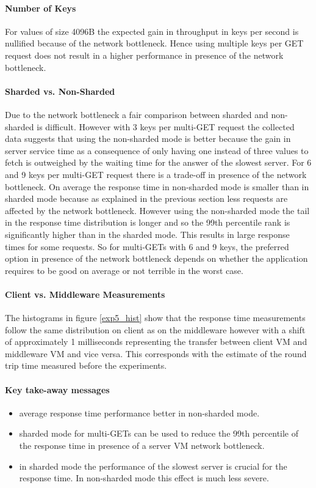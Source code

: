 \documentclass[report.tex]{subfiles}
\begin{document}
\paragraph{Number of Keys}
For values of size 4096B the expected gain in throughput in keys per second is nullified because of the network bottleneck. Hence using multiple keys per GET request does not result in a higher performance in presence of the network bottleneck.

\paragraph{Sharded vs. Non-Sharded}
Due to the network bottleneck a fair comparison between sharded and non-sharded is difficult. 
However with 3 keys per multi-GET request the collected data suggests that using the non-sharded mode is better because the gain in server service time as a consequence of only having one instead of three values to fetch is outweighed by the waiting time for the answer of the slowest server. For 6 and 9 keys per multi-GET request there is a trade-off in presence of the network bottleneck. On average the response time in non-sharded mode is smaller than in sharded mode because as explained in the previous section less requests are affected by the network bottleneck. However using the non-sharded mode the tail in the response time distribution is longer and so the 99th percentile rank is significantly higher than in the sharded mode. This results in large response times for some requests.
So for multi-GETs with 6 and 9 keys, the preferred option in presence of the network bottleneck depends on whether the application requires to be good on average or not terrible in the worst case. 

\paragraph{Client vs. Middleware Measurements}
The histograms in figure \ref{exp5_hist} show that the response time measurements follow the same distribution on client as on the middleware however with a shift of approximately 1 milliseconds representing the transfer between client VM and middleware VM and vice versa. This corresponds with the estimate of the round trip time measured before the experiments.
\paragraph{Key take-away messages}
\begin{itemize}
	\vitemsep
	\item average response time performance better in non-sharded mode.
	\item sharded mode for multi-GETs can be used to reduce the 99th percentile of the response time in presence of a server VM network bottleneck.
	\item in sharded mode the performance of the slowest server is crucial for the response time. In non-sharded mode this effect is much less severe.
\end{itemize}
\end{document}
